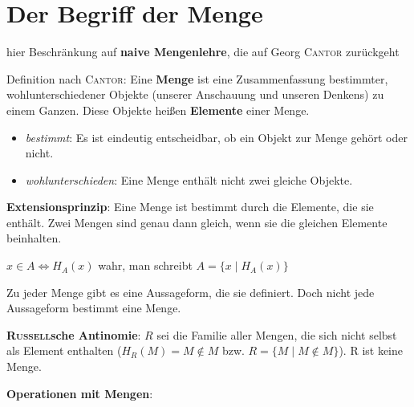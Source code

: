 \section {%
    Der Begriff der Menge%
}

hier Beschränkung auf \textbf{naive Mengenlehre}, die auf Georg \textsc{Cantor}
zurückgeht

Definition nach \textsc{Cantor}:
Eine \textbf{Menge} ist eine Zusammenfassung bestimmter, wohlunterschiedener
Objekte (unserer Anschauung und unseren Denkens) zu einem Ganzen.
Diese Objekte heißen \textbf{Elemente} einer Menge.

\begin{itemize}
    \item \emph{bestimmt}: Es ist eindeutig entscheidbar, ob ein Objekt zur
    Menge gehört oder nicht.

    \item \emph{wohlunterschieden}: Eine Menge enthält nicht zwei gleiche
    Objekte.
\end{itemize}

\textbf{Extensionsprinzip}: Eine Menge ist bestimmt durch die Elemente, die sie
enthält.
Zwei Mengen sind genau dann gleich, wenn sie die gleichen Elemente beinhalten.

$x \in A \Leftrightarrow H_{A}(x)$ wahr, man schreibt
$A = \{x \;|\; H_{A}(x)\}$

Zu jeder Menge gibt es eine Aussageform, die sie definiert.
Doch nicht jede Aussageform bestimmt eine Menge.

\textbf{\textsc{Russell}sche Antinomie}:
$R$ sei die Familie aller Mengen, die sich nicht selbst als Element enthalten
($H_{R}(M) = M \notin M$ bzw. $R = \{M \;|\; M \notin M\}$).
R ist keine Menge.

\textbf{Operationen mit Mengen}:

